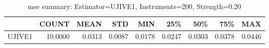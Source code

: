 \begin{table}[ht]
\centering
\caption{mse summary: Estimator=UJIVE1, Instruments=200, Strength=0.20}
\begin{tabular}{lrrrrrrrr}
\toprule
 & COUNT & MEAN & STD & MIN & 25\% & 50\% & 75\% & MAX \\
\midrule
UJIVE1 & 10.0000 & 0.0313 & 0.0087 & 0.0178 & 0.0247 & 0.0303 & 0.0378 & 0.0446 \\
\bottomrule
\end{tabular}
\end{table}
